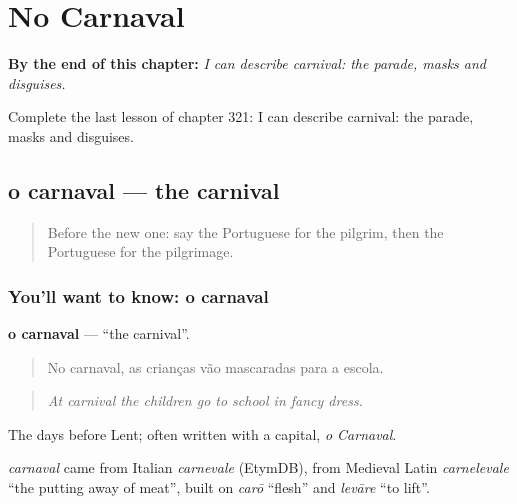 
\chapter{No Carnaval}
\label{ch:pt-no-carnaval}

\begin{chapteropening}
\textbf{By the end of this chapter:} \emph{I can describe carnival: the parade, masks and disguises.}

Complete the last lesson of chapter 321: I can describe carnival: the parade, masks and disguises.
\end{chapteropening}

\section[o carnaval]{o carnaval — the carnival}

\label{lesson:PT-C321-carnaval}



\begin{quote}
Before the new one: say the Portuguese for the pilgrim, then the Portuguese for the pilgrimage.
\end{quote}

\subsection*{You'll want to know: o carnaval}
\textbf{o carnaval} — \textquotedblleft{}the carnival\textquotedblright{}.

\begin{quote}
No carnaval, as crianças vão mascaradas para a escola.
\end{quote}

\begin{quote}
\emph{At carnival the children go to school in fancy dress.}
\end{quote}

The days before Lent; often written with a capital, \emph{o Carnaval}.

\begin{cousinweb}
\emph{carnaval} came from Italian \emph{carnevale} (EtymDB), from Medieval Latin \emph{carnelevale} \textquotedblleft{}the putting away of meat\textquotedblright{}, built on \emph{carō} \textquotedblleft{}flesh\textquotedblright{} and \emph{levāre} \textquotedblleft{}to lift\textquotedblright{}.
\end{cousinweb}

